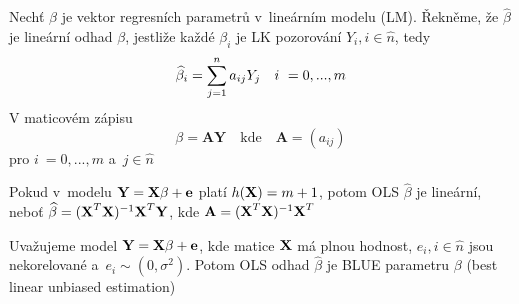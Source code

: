\begin{define}
	Nechť $\beta$ je vektor regresních parametrů v~lineárním modelu (LM). Řekněme, že $\widehat{\beta}$ je lineární odhad $\beta$, jestliže každé $\beta_i$ je LK pozorování $Y_i, i\in\widehat{n} $, tedy
	 $$
		\widehat{\beta}_i = \sum\limits_{j=1}^{n} a_{ij} Y_j \quad i~ = 0,...,m
	 $$
V maticovém zápisu
	 $$
		\beta = \textbf{AY} \quad \text{kde} \quad \textbf{A} = (a_{ij})
	 $$
pro $i~ = 0,..., m$ a~$j  \in\widehat{n} $
\end{define}
\begin{remark}
 Pokud v~modelu $\textbf{Y} = \textbf{X} \beta + \textbf{e}$ platí $h(\textbf{X}) = m+1$, potom OLS $\widehat{\beta}$ je lineární, neboť $\widehat{\beta} = (\textbf{X}^T \textbf{X})^{-1} \textbf{X}^T \textbf{Y}$, kde $\textbf{A} = (\textbf{X}^T \textbf{X})^{-1} \textbf{X}^T$
\end{remark}
\begin{theorem}
	Uvažujeme model $\textbf{Y} = \textbf{X} \beta + \textbf{e}$, kde matice $\textbf{X}$ má plnou hodnost, $e_i, i\in\widehat{n} $ jsou nekorelované a~$e_i \sim (0, \sigma^2)$. Potom OLS odhad $\widehat{\beta}$ je BLUE parametru $\beta$ (best linear unbiased estimation)
\end{theorem}
